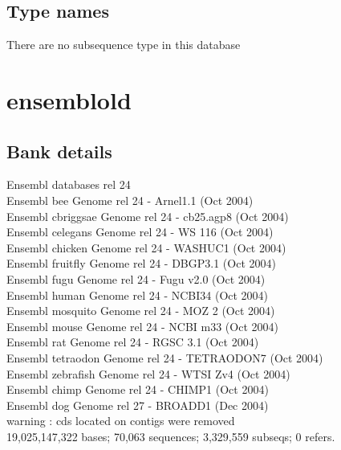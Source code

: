 \documentclass{article}
\begin{document}
\begin{Schunk}
\subsection{Type names}
There are no subsequence type in this database
\section{ ensemblold }
\subsection{Bank details}
Ensembl databases rel 24\\
Ensembl bee  Genome rel 24 - Arnel1.1 (Oct 2004)\\
Ensembl cbriggsae  Genome rel 24 - cb25.agp8 (Oct 2004)\\
Ensembl celegans  Genome rel 24 - WS 116 (Oct 2004)\\
Ensembl chicken  Genome rel 24 - WASHUC1 (Oct 2004)\\
Ensembl fruitfly  Genome rel 24 - DBGP3.1 (Oct 2004)\\
Ensembl fugu  Genome rel 24 - Fugu v2.0 (Oct 2004)\\
Ensembl human  Genome rel 24 - NCBI34 (Oct 2004)\\
Ensembl mosquito  Genome rel 24 - MOZ 2 (Oct 2004)\\
Ensembl mouse  Genome rel 24 - NCBI m33 (Oct 2004)\\
Ensembl rat  Genome rel 24 - RGSC 3.1 (Oct 2004)\\
Ensembl tetraodon  Genome rel 24 - TETRAODON7 (Oct 2004)\\
Ensembl zebrafish  Genome rel 24 - WTSI Zv4 (Oct 2004)\\
Ensembl chimp  Genome rel 24 - CHIMP1 (Oct 2004)\\
Ensembl dog  Genome rel 27 - BROADD1 (Dec 2004)\\
warning : cds located on contigs were removed\\
19,025,147,322 bases; 70,063 sequences; 3,329,559 subseqs; 0 refers.


\end{Schunk}
\end{document}
